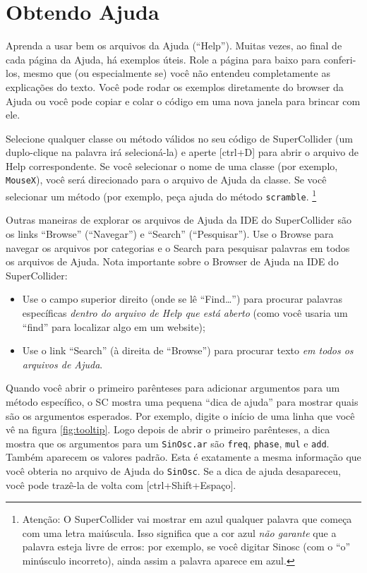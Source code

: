 \section{Obtendo Ajuda}

Aprenda a usar bem os arquivos da Ajuda (“Help”). Muitas vezes, ao final de cada página da Ajuda, há exemplos úteis.  Role a página para baixo para conferi-los, mesmo que (ou especialmente se) você não entendeu completamente as explicações do texto. Você pode rodar os exemplos diretamente do browser da Ajuda ou você pode copiar e colar o código em uma nova janela para brincar com ele. 

Selecione qualquer classe ou método válidos no seu código de SuperCollider (um duplo-clique na palavra irá selecioná-la) e aperte [ctrl+D] para abrir o arquivo de Help correspondente. Se você selecionar o nome de uma classe (por exemplo, \texttt{MouseX}), você será direcionado para o arquivo de Ajuda da classe. Se você selecionar um método (por exemplo, peça ajuda do método \texttt{scramble}. \footnote{Atenção: O SuperCollider vai mostrar em azul qualquer palavra que começa com uma letra maiúscula. Isso significa que a cor azul \emph{não garante} que a palavra esteja livre de erros: por exemplo, se você digitar Sinosc (com o “o” minúsculo incorreto), ainda assim a palavra aparece em azul.}

Outras maneiras de explorar os arquivos de Ajuda da IDE do SuperCollider são os links “Browse” (“Navegar”) e “Search” (“Pesquisar”). Use o Browse para navegar os arquivos por categorias e o Search para pesquisar palavras em todos os arquivos de Ajuda.
Nota importante sobre o Browser de Ajuda na IDE do SuperCollider:

\begin{itemize}
\item Use o campo superior direito (onde se lê “Find…”) para procurar palavras específicas \emph{dentro do arquivo de Help que está aberto} (como você usaria um “find” para localizar algo em um website);
\item Use o link “Search” (à direita de “Browse”) para procurar texto \emph{em todos os arquivos de Ajuda}.
\end{itemize}

Quando você abrir o primeiro parênteses para adicionar argumentos para um método específico, o SC mostra uma pequena “dica de ajuda” para mostrar quais são os argumentos esperados. Por exemplo, digite o início de uma linha que você vê na figura \ref{fig:tooltip}. Logo depois de abrir o primeiro parênteses, a dica mostra que os argumentos para um \texttt{SinOsc.ar} são \texttt{freq}, \texttt{phase}, \texttt{mul} e \texttt{add}. Também aparecem os valores padrão. Esta é exatamente a mesma informação que você obteria no arquivo de Ajuda do \texttt{SinOsc}. Se a dica de ajuda desapareceu, você pode trazê-la de volta com [ctrl+Shift+Espaço].

